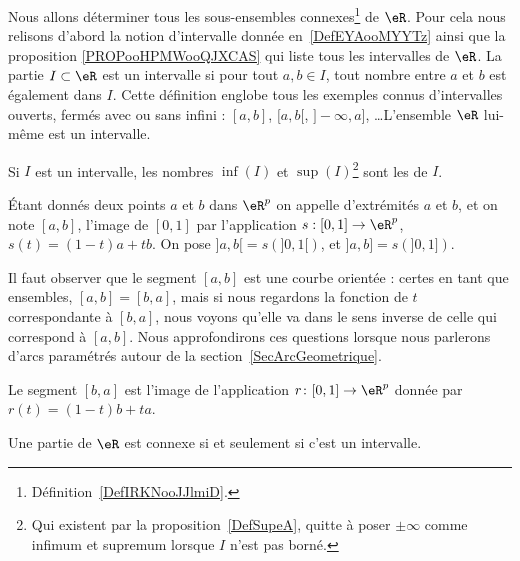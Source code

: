 Nous allons déterminer tous les sous-ensembles connexes\footnote{Définition~\ref{DefIRKNooJJlmiD}.} de $\eR$. Pour cela nous relisons d'abord la notion d'intervalle donnée en~\ref{DefEYAooMYYTz} ainsi que la proposition \ref{PROPooHPMWooQJXCAS} qui liste tous les intervalles de \( \eR\). La partie \( I\subset \eR\) est un intervalle si pour tout \( a,b\in I\), tout nombre entre \( a\) et \( b\) est également dans \( I\). Cette définition englobe tous les exemples connus d'intervalles ouverts, fermés avec ou sans infini : $[a,b]$, $[a,b[$, $]-\infty,a]$, \ldots L'ensemble \( \eR\) lui-même est un intervalle.

Si \( I\) est un intervalle, les nombres \( \inf(I)\) et \( \sup(I)\)\footnote{Qui existent par la proposition~\ref{DefSupeA}, quitte à poser \( \pm\infty\) comme infimum et supremum lorsque \( I\) n'est pas borné.} sont les  de \( I\).

\begin{definition}      \label{DefLISOooDHLQrl}
	Étant donnés deux points $a$ et $b$ dans $\eR^p$ on appelle  d'extrémités $a$ et $b$, et on note $[a,b]$, l'image de $[0,1]$ par l'application $s: [0,1]\to \eR^p$, $s(t)= (1-t)a+tb$.  On pose $]a,b[=s\left(]0,1[\right)$, et  $]a,b]=s\left(]0,1]\right)$.
\end{definition}
Il faut observer que le segment $[a,b]$ est une courbe orientée : certes en tant que ensembles, $[a,b]=[b,a]$, mais si nous regardons la fonction de $t$ correspondante à $[b,a]$, nous voyons qu'elle va dans le sens inverse de celle qui correspond à $[a,b]$. Nous approfondirons ces questions lorsque nous parlerons d'arcs paramétrés autour de la section~\ref{SecArcGeometrique}.

Le segment $[b,a]$ est l'image de l'application $r\colon [0,1]\to \eR^p$ donnée par $r(t)=(1-t)b+ta$.

\begin{proposition} \label{PropInterssiConn}
    Une partie de $\eR$ est connexe si et seulement si c'est un intervalle.
\end{proposition}

